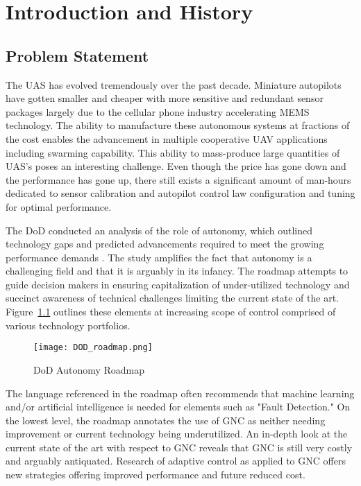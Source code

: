 \chapter{Introduction and History}\label{ch:intro}

\section{Problem Statement}
The \ac{UAS} has evolved tremendously over the past decade.  Miniature autopilots have gotten smaller and cheaper with more sensitive and redundant sensor packages largely due to the cellular phone industry accelerating \ac{MEMS} technology.  The ability to manufacture these autonomous systems at fractions of the cost enables the advancement in multiple cooperative UAV applications including swarming capability.  This ability to mass-produce large quantities of \ac{UAS}'s poses an interesting challenge.  Even though the price has gone down and the performance has gone up, there still exists a significant amount of man-hours dedicated to sensor calibration and autopilot control law configuration and tuning for optimal performance.  

The \ac{DoD} conducted an analysis of the role of autonomy, which outlined technology gaps and predicted advancements required to meet the growing performance demands \cite{dodroadmap}.  The study amplifies the fact that autonomy is a challenging field and that it is arguably in its infancy.  The roadmap attempts to guide decision makers in ensuring capitalization of under-utilized technology and succinct awareness of technical challenges limiting the current state of the art.  Figure~\ref{fig:dod_roadmap} outlines these elements at increasing scope of control comprised of various technology portfolios.  
\begin{figure}[h!]
 \centering
  \texttt{[image: DOD\_roadmap.png]}
  \caption{DoD Autonomy Roadmap \cite{dodroadmap}}
  \label{fig:dod_roadmap}
\end{figure}
The language referenced in the roadmap often recommends that machine learning and/or artificial intelligence is needed for elements such as "Fault Detection."  On the lowest level, the roadmap annotates the use of \ac{GNC} as neither needing improvement or current technology being underutilized.  An in-depth look at the current state of the art with respect to \ac{GNC} reveals that \ac{GNC} is still very costly and arguably antiquated.  Research of adaptive control as applied to \ac{GNC} offers new strategies offering improved performance and future reduced cost.

